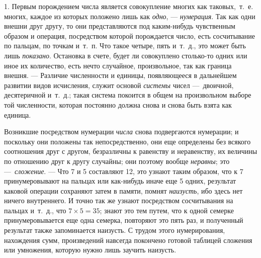 {1. Первым порождением числа является совокупление многих как таковых,~т.~е.
многих, каждое из которых положено лишь как {\em одно},
— {\em нумерация}. Так как одни внешни друг другу, то
они представляются под каким-нибудь чувственным образом и операция,
посредством которой порождается число, есть сосчитывание по пальцам, по
точкам и~т.~п. Что такое четыре, пять и~т.~д., это может быть лишь
{\em показано}. Остановка в счете, будет ли совокуплено
столько-то одних или иное их количество, есть нечто случайное,
произвольное, так как граница внешня. — Различие численности и единицы,
появляющееся в дальнейшем развитии видов исчисления, служит основой
{\em системы} чисел —~двоичной, десятеричной и~т.~д.;
такая система покоится в общем на произвольном выборе той численности,
которая постоянно должна снова и снова быть взята как единица.

Возникшие посредством нумерации {\em числа} снова
подвергаются нумерации; и поскольку они положены так непосредственно, они
еще определены без всякого соотношения друг с другом, безразличны к
равенству и неравенству, их величины по отношению друг к другу случайны;
они поэтому вообще {\em неравны}; это
—~{\em сложение}. — Что 7 и 5 составляют 12, это узнают
таким образом, что к 7 принумеровывают на пальцах или как-нибудь иначе еще
5 одних, результат каковой операции сохраняют затем в памяти, помнят
{\em наизусть}, ибо здесь нет ничего внутреннего. И
точно так же узнают посредством сосчитывания на пальцах и~т.~д., что
$7 \times 5 = 35$; знают это тем путем, что к одной семерке
принумеровывается еще
одна семерка, повторяют это пять раз, и полученный результат также
запоминается наизусть. С трудом этого нумерирования, нахождения сумм,
произведений навсегда покончено готовой таблицей сложения или умножения,
которую нужно лишь заучить наизусть.

}
